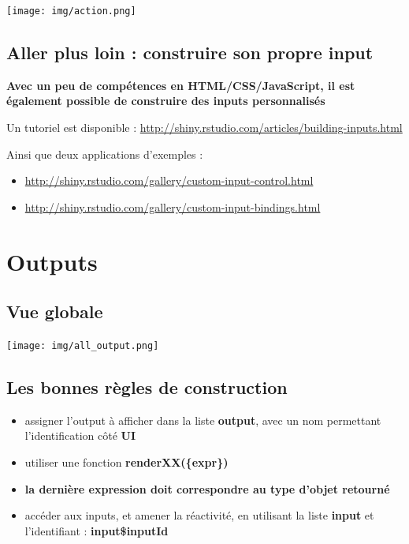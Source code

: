 \documentclass[
]{article}
\providecommand{\tightlist}{%
  \setlength{\itemsep}{0pt}\setlength{\parskip}{0pt}}
\begin{document}
\texttt{[image: img/action.png]}

\hypertarget{aller-plus-loin-construire-son-propre-input}{%
\subsection{Aller plus loin : construire son propre
input}\label{aller-plus-loin-construire-son-propre-input}}

\textbf{Avec un peu de compétences en HTML/CSS/JavaScript, il est
également possible de construire des inputs personnalisés}

Un tutoriel est disponible :
\url{http://shiny.rstudio.com/articles/building-inputs.html}

Ainsi que deux applications d'exemples :

\begin{itemize}
\item
  \url{http://shiny.rstudio.com/gallery/custom-input-control.html}
\item
  \url{http://shiny.rstudio.com/gallery/custom-input-bindings.html}
\end{itemize}

\hypertarget{outputs}{%
\section{Outputs}\label{outputs}}

\hypertarget{vue-globale-1}{%
\subsection{Vue globale}\label{vue-globale-1}}

\texttt{[image: img/all\_output.png]}

\hypertarget{les-bonnes-ruxe8gles-de-construction}{%
\subsection{Les bonnes règles de
construction}\label{les-bonnes-ruxe8gles-de-construction}}

\begin{itemize}
\tightlist
\item
  assigner l'output à afficher dans la liste \textbf{output}, avec un
  nom permettant l'identification côté \textbf{UI}
\item
  utiliser une fonction \textbf{renderXX(\{expr\})}
\item
  \textbf{la dernière expression doit correspondre au type d'objet
  retourné}
\item
  accéder aux inputs, et amener la réactivité, en utilisant la liste
  \textbf{input} et l'identifiant : \textbf{input\$inputId}
\end{itemize}
\end{document}
